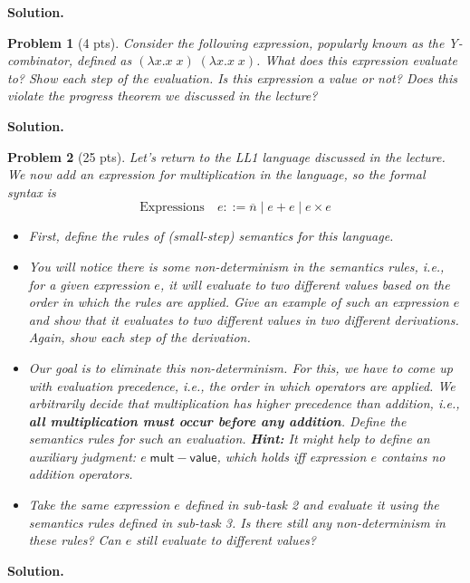 \documentclass{article}
\newcommand{\m}[1]{\mathsf{#1}}
\newcommand{\elam}[2]{\lambda{#1}.{#2}}
\newcommand{\eapp}[2]{#1 \; #2}
\newcommand{\num}[1]{\overline{#1}}
\newcommand{\multval}[1]{#1 \; \m{mult{-}value}}
\newtheorem{problem}{Problem}
\newenvironment{solution}{\textbf{Solution.}}{}
\begin{document}
\begin{solution}
    
\end{solution}


\begin{problem}[4 pts]
    Consider the following expression, popularly known as the Y-combinator, defined as
    $\eapp{(\elam{x}{\eapp{x}{x}})}{(\elam{x}{\eapp{x}{x}})}$.
    What does this expression evaluate to? Show each step of the evaluation. Is this expression a value or not?
    Does this violate the progress theorem we discussed in the lecture?
\end{problem}

\begin{solution}
    
\end{solution}


\begin{problem}[25 pts]
    Let's return to the LL1 language discussed in the lecture. We now add an expression for multiplication in the language,
    so the formal syntax is
    \[
        \text{Expressions} \quad e ::= \num{n} \mid e + e \mid e \times e
    \]

    \begin{itemize}
        \item[(5 pts)] First, define the rules of (small-step) semantics for this language.
        
        \item[(5 pts)] You will notice there is some non-determinism in the semantics rules, i.e., for a given expression $e$,
        it will evaluate to two different values based on the order in which the rules are applied. Give an example of such an
        expression $e$ and show that it evaluates to two different values in two different derivations.
        Again, show each step of the derivation.

        \item[(10 pts)] Our goal is to eliminate this non-determinism. For this, we have to come up with evaluation precedence,
        i.e., the order in which operators are applied. We arbitrarily decide that multiplication has higher precedence than
        addition, i.e., \textbf{all multiplication must occur before any addition}. Define the semantics rules for such an evaluation.
        \textbf{Hint:} It might help to define an auxiliary judgment: $\multval{e}$, which holds iff expression $e$ contains
        no addition operators.

        \item[(5 pts)] Take the same expression $e$ defined in sub-task 2 and evaluate it using the semantics rules defined
        in sub-task 3. Is there still any non-determinism in these rules? Can $e$ still evaluate to different values?
    \end{itemize}
\end{problem}

\begin{solution}

\end{solution}
\end{document}
